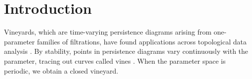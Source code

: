 \documentclass[a4paper,english,numberwithinsect]{eurocg26-submission}
\newcommand{\M}{\mathcal{M}}
\begin{document}
\begin{abstract}
We present an interactive web-based 2D tool, Bouquet2D, designed to explore these transitions through the lens of vineyards. By parameterizing $x$ along a user-defined loop $\gamma$, our tool tracks the continuous evolution of persistence diagrams, revealing the complex ``braiding'' patterns and monodromy in the vineyard recently characterized by Chambers et al. [SODA 26].

The tool features a real-time spline-based interface, allowing researchers to deform $\M$ and observe how geometric bifurcations manifest as topological events in the vineyard. By exhibiting the relation between the symmetry and focal set and the topology of the vineyard, this software provides a visual framework for investigating the origin of topology in vineyards.
\end{abstract}

\section{Introduction}


Vineyards, which are time-varying persistence diagrams arising from one-parameter families of filtrations, have found applications across topological data analysis \cite{Bergomi2020, DeeAlgar2021, Yoo2016}. By stability, points in persistence diagrams vary continuously with the parameter, tracing out curves called vines \cite{CohenSteiner2006, turner2023representing}. When the parameter space is periodic, we obtain a closed vineyard.
\end{document}
